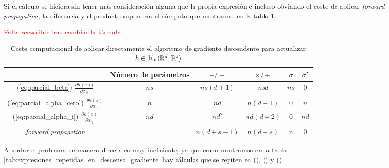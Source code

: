 Si el cálculo se hiciera sin tener más consideración alguna que la propia expresión e incluso obviando el coste de aplicar \textit{forward propagation}, la diferencia y el producto
supondría el cómputo que mostramos en la tabla \ref{tab:coste-computacional-directa}.

\textcolor{red}{Falta reescribir tras cambiar la fórmula}
\begin{table}[H]
    \begin{center}
    \begin{tabular}{| c | c | c | c | c | c| }
    \hline
       & Número de parámetros & $+ / -$ & $\times / \div$ & $\sigma$ & $\sigma'$
    \\ \hline
    (\ref{eq:parcial_beta}) $\frac{\partial h(x))}{\partial \beta_{j k}}$ 
    & $n s$ & $n s (d+1)$ & $n s d$ & $n s$ & 0
    \\
    \hline
    (\ref{eq:parcial_alpha_cero}) $\frac{\partial h(x)}{\partial \alpha_{0 i}}$ 
    & $n$ & $n d$ & $n (d + 1)$ & 0 & $n$
    \\
    \hline
    (\ref{eq:parcial_alpha_i}) $\frac{\partial h(x)}{\partial \alpha_{i j}}$ 
    & $n d$ & $n d^2$ & $n d (d + 2)$ & 0 & $n d$
    \\
    \hline
    \textit{forward propagation}
    & & $n (d+s-1)$ & $n(d + s)$ & n & 0
    \\
    \hline
    \end{tabular}
    \caption{Coste computacional de aplicar directamente el  algoritmo de gradiente 
    descendente para actualizar $h \in \mathcal{H}_n(\mathbb{R}^d, \mathbb{R}^s)$}
    \label{tab:coste-computacional-directa}
    \end{center}
\end{table}

Abordar el problema de manera directa es muy ineficiente, ya que como mostramos en la tabla 
\ref{tab:expresiones_repetidas_en_descenso_gradiente}
hay cálculos que se repiten en (), () y  
(). 

